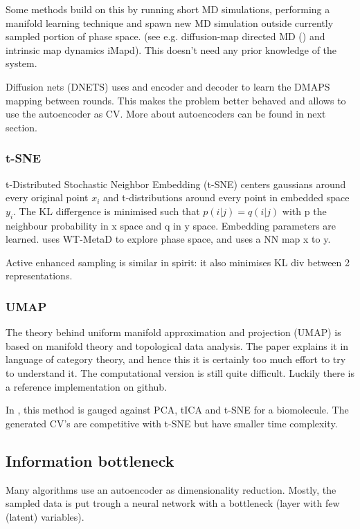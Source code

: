 \documentclass{article}
\begin{document}
Some methods build on this by running short MD simulations, performing a manifold learning technique and spawn new MD simulation outside currently sampled portion of phase space. (see e.g. diffusion-map directed MD (\cite{Preto2014}) and intrinsic map dynamics iMapd\cite{Chiavazzo2017}). This doesn't need any prior knowledge of the system.

Diffusion nets (DNETS) \cite{Mishne2015} uses and encoder and decoder to learn the DMAPS mapping between rounds. This makes the problem better behaved and allows to use the autoencoder as CV. More about autoencoders can be found in next section.

\subsubsection{t-SNE}
t-Distributed Stochastic Neighbor Embedding (t-SNE) \cite{vanDerMaarten2008} centers gaussians around every original point $x_i$ and t-distributions around every point in embedded space $y_i$. The KL differgence is minimised such that $p(i|j) = q(i|j)$ with p the neighbour probability in x space and q in y space. Embedding parameters are learned. \cite{Rydzewski2021} uses WT-MetaD to explore phase space, and uses a NN  map x to y.

Active enhanced sampling \cite{Zhang2018} is similar in spirit: it also minimises KL div between 2 representations.

\subsubsection{UMAP}\label{ss:umap}

The theory behind uniform manifold approximation and projection (UMAP) \cite{McInnes2018} is based on manifold theory and topological data analysis. The paper explains it in language of category theory, and hence this it is certainly too much effort to try to understand it. The computational version is still quite difficult. Luckily there is a reference implementation on github.

In \cite{Trozzi2021}, this method is gauged against PCA, tICA and t-SNE for a biomolecule. The generated CV's are competitive with t-SNE but have smaller time complexity.

\subsection{Information bottleneck }

Many algorithms use an autoencoder as dimensionality reduction. Mostly, the sampled data is put trough a neural network with a bottleneck (layer with few (latent) variables).
\end{document}
